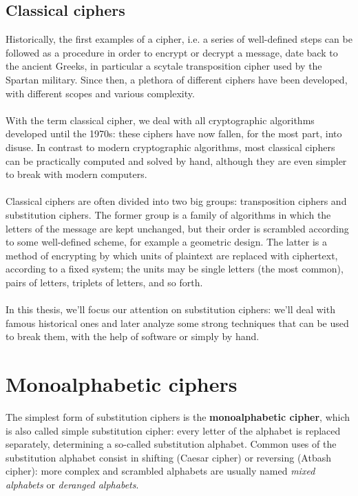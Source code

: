 \documentclass[Lau,binding=0.6cm,oneside]{sapthesis}
\begin{document}
\section{Classical ciphers}
Historically, the first examples of a cipher, i.e. a series of well-defined steps can be followed as a procedure in order to encrypt or decrypt a message, date back to the ancient Greeks, in particular a scytale transposition cipher used by the Spartan military. Since then, a plethora of different ciphers have been developed, with different scopes and various complexity.\\\\
With the term classical cipher, we deal with all cryptographic algorithms developed until the 1970s: these ciphers have now fallen, for the most part, into disuse. In contrast to modern cryptographic algorithms, most classical ciphers can be practically computed and solved by hand, although they are even simpler to break with modern computers.\\\\
Classical ciphers are often divided into two big groups: transposition ciphers and substitution ciphers. The former group is a family of algorithms in which the letters of the message are kept unchanged, but their order is scrambled according to some well-defined scheme, for example a geometric design. The latter is a method of encrypting by which units of plaintext are replaced with ciphertext, according to a fixed system; the units may be single letters (the most common), pairs of letters, triplets of letters, and so forth.\\\\
In this thesis, we'll focus our attention on substitution ciphers: we'll deal with famous historical ones and later analyze some strong techniques that can be used to break them, with the help of software or simply by hand.

\chapter{Monoalphabetic ciphers}
The simplest form of substitution ciphers is the \textbf{monoalphabetic cipher}, which is also called simple substitution cipher: every letter of the alphabet is replaced separately, determining a so-called substitution alphabet. Common uses of the substitution alphabet consist in shifting (Caesar cipher) or reversing (Atbash cipher): more complex and scrambled alphabets are usually named \textit{mixed alphabets} or \textit{deranged alphabets}.\\\\
\end{document}
